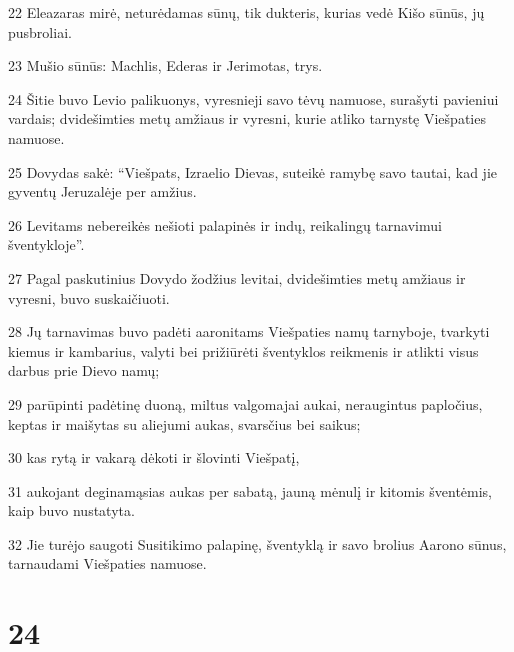\par 22 Eleazaras mirė, neturėdamas sūnų, tik dukteris, kurias vedė Kišo sūnūs, jų pusbroliai. 
\par 23 Mušio sūnūs: Machlis, Ederas ir Jerimotas, trys. 
\par 24 Šitie buvo Levio palikuonys, vyresnieji savo tėvų namuose, surašyti pavieniui vardais; dvidešimties metų amžiaus ir vyresni, kurie atliko tarnystę Viešpaties namuose. 
\par 25 Dovydas sakė: “Viešpats, Izraelio Dievas, suteikė ramybę savo tautai, kad jie gyventų Jeruzalėje per amžius. 
\par 26 Levitams nebereikės nešioti palapinės ir indų, reikalingų tarnavimui šventykloje”. 
\par 27 Pagal paskutinius Dovydo žodžius levitai, dvidešimties metų amžiaus ir vyresni, buvo suskaičiuoti. 
\par 28 Jų tarnavimas buvo padėti aaronitams Viešpaties namų tarnyboje, tvarkyti kiemus ir kambarius, valyti bei prižiūrėti šventyklos reikmenis ir atlikti visus darbus prie Dievo namų; 
\par 29 parūpinti padėtinę duoną, miltus valgomajai aukai, neraugintus papločius, keptas ir maišytas su aliejumi aukas, svarsčius bei saikus; 
\par 30 kas rytą ir vakarą dėkoti ir šlovinti Viešpatį, 
\par 31 aukojant deginamąsias aukas per sabatą, jauną mėnulį ir kitomis šventėmis, kaip buvo nustatyta. 
\par 32 Jie turėjo saugoti Susitikimo palapinę, šventyklą ir savo brolius Aarono sūnus, tarnaudami Viešpaties namuose.



\chapter{24}

